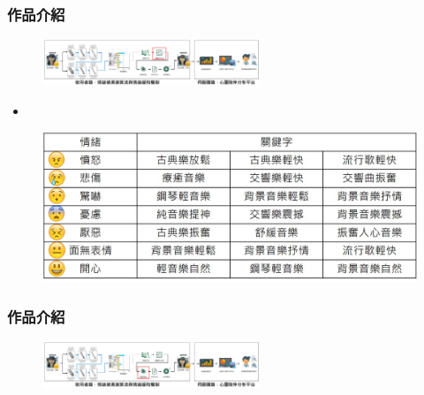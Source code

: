 \documentclass[10pt, conference, compsocconf]{beamer}
\begin{document}
\begin{CJK}{UTF8}{}
\begin{frame}
\frametitle{作品介紹}

\vspace{-5mm}
\begin{figure}[t]
\begin{flushright}
\includegraphics[width=6.5cm]{./Figures/framework_version4_5.pdf}
\end{flushright}
\end{figure}

\vspace{-5mm}

\begin{itemize}
\item {}
\end{itemize}

\begin{figure}[!t]
\begin{center}
\includegraphics[width=12cm]{./Figures/504.jpg}
\end{center}
\end{figure}
\end{frame}

\begin{frame}
\frametitle{作品介紹}

\vspace{-5mm}
\begin{figure}[t]
\begin{flushright}
\includegraphics[width=6.5cm]{./Figures/framework_version4_6.pdf}
\end{flushright}
\end{figure}

\vspace{-5mm}


\end{frame}
\end{CJK}
\end{document}
